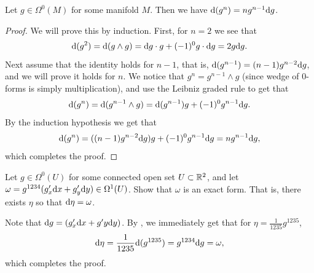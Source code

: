 \documentclass[11pt,a4paper]{article}
\begin{document}
\begin{proposition}
  \label{prop:identity-of-zero-forms}
  Let $g \in \Omega^0(M)$ for some manifold $M$.
  Then we have $\mathrm{d}(g^n) = n g^{n-1} \mathrm{d} g$.
\end{proposition}
\begin{proof}
  We will prove this by induction.
  First, for $n = 2$ we see that
  \[
    \mathrm{d}(g^2) =
    \mathrm{d}(g \wedge g) =
    \mathrm{d} g \cdot g + (-1)^{0} g \cdot \mathrm{d} g =
    2g \mathrm{d} g.
  \]
  Next assume that the identity holds for $n - 1$,
  that is, $\mathrm{d}(g^{n-1}) = (n-1) g^{n-2} \mathrm{d} g$,
  and we will prove it holds for $n$.
  We notice that $g^n = g^{n-1} \wedge g$ (since wedge of $0$-forms is
  simply multiplication),
  and use the Leibniz graded rule to get that
  \[
    \mathrm{d}(g^n) =
    \mathrm{d}(g^{n-1} \wedge g) =
    \mathrm{d}(g^{n-1}) g + (-1)^{0} g^{n-1} \mathrm{d} g.
  \]
  By the induction hypothesis we get that
  \[
    \mathrm{d}(g^n) =
    ((n-1) g^{n-2} \mathrm{d} g) g + (-1)^{0} g^{n-1} \mathrm{d} g =
    n g^{n-1} \mathrm{d} g,
  \]
  which completes the proof.
\end{proof}
\begin{exercise}
  Let $g \in \Omega^0(U)$ for some connected open set $U \subset \mathbb{R}^2$,
  and let $\omega = g^{1234} (g'_x \dx + g'_y \dy) \in \Omega^1(U)$.
  Show that $\omega$ is an exact form.
  That is, there exists $\eta$ so that $\mathrm{d} \eta = \omega$.
\end{exercise}
\begin{solution}
  Note that $\dif g = (g'_x \dx + g'y \dy)$.
  By ,
  we immediately get that for $\eta = \frac{1}{1235} g^{1235}$,
  \[
    \mathrm{d} \eta =
    \frac{1}{1235} \mathrm{d}(g^{1235}) =
    g^{1234} \mathrm{d} g = \omega,
  \]
  which completes the proof.
\end{solution}
\end{document}
